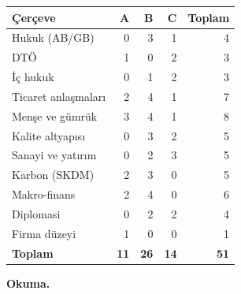 \nopagebreak[4]

\begingroup\gbtablo\footnotesize

\begin{longtable}[]{@{}lrrrr@{}}
\toprule\noalign{}
\textbf{Çerçeve} & \textbf{A} & \textbf{B} & \textbf{C} & \textbf{Toplam} \\
\midrule\noalign{}
\endhead
\bottomrule\noalign{}
\endlastfoot
Hukuk (AB/GB) & 0 & 3 & 1 & 4 \\
DTÖ & 1 & 0 & 2 & 3 \\
İç hukuk & 0 & 1 & 2 & 3 \\
Ticaret anlaşmaları & 2 & 4 & 1 & 7 \\
Menşe ve gümrük & 3 & 4 & 1 & 8 \\
Kalite altyapısı & 0 & 3 & 2 & 5 \\
Sanayi ve yatırım & 0 & 2 & 3 & 5 \\
Karbon (SKDM) & 2 & 3 & 0 & 5 \\
Makro-finans & 2 & 4 & 0 & 6 \\
Diplomasi & 0 & 2 & 2 & 4 \\
Firma düzeyi & 1 & 0 & 0 & 1 \\
\textbf{Toplam} & \textbf{11} & \textbf{26} & \textbf{14} & \textbf{51} \\
\end{longtable}

\endgroup

\textbf{Okuma.}

